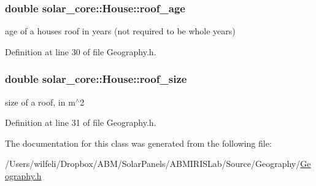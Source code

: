 \subsubsection[{roof\+\_\+age}]{\setlength{\rightskip}{0pt plus 5cm}double solar\+\_\+core\+::\+House\+::roof\+\_\+age}\label{classsolar__core_1_1_house_aa6491ce4f3fc6d99a59ea80cfb8194fc}
age of a house\textquotesingle{}s roof in years (not required to be whole years) 

Definition at line 30 of file Geography.\+h.

\hypertarget{classsolar__core_1_1_house_a7f872cb768b83e70e263590078fa4c7d}{}
\subsubsection[{roof\+\_\+size}]{\setlength{\rightskip}{0pt plus 5cm}double solar\+\_\+core\+::\+House\+::roof\+\_\+size}\label{classsolar__core_1_1_house_a7f872cb768b83e70e263590078fa4c7d}
size of a roof, in m$^\wedge$2 

Definition at line 31 of file Geography.\+h.



The documentation for this class was generated from the following file\+:\begin{DoxyCompactItemize}
\item 
/\+Users/wilfeli/\+Dropbox/\+A\+B\+M/\+Solar\+Panels/\+A\+B\+M\+I\+R\+I\+S\+Lab/\+Source/\+Geography/\hyperlink{_geography_8h}{Geography.\+h}\end{DoxyCompactItemize}
